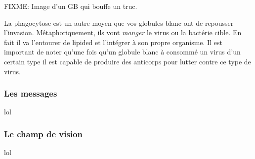\documentclass[a4paper,twoside,12pt]{article}
\begin{document}
    FIXME: Image d'un GB qui bouffe un truc.

    La phagocytose est un autre moyen que vos globules blanc ont de repousser
    l'invasion. Métaphoriquement, ils vont \emph{manger} le virus ou la
    bactérie cible. En fait il va l'entourer de lipided et l'intégrer à son
    propre organisme. Il est important de noter qu'une fois qu'un globule
    blanc à consommé un virus d'un certain type il est capable de produire des
    anticorps pour lutter contre ce type de virus.
      
    \subsubsection{Les messages}

    lol

    \subsubsection{Le champ de vision}

    lol
\end{document}
